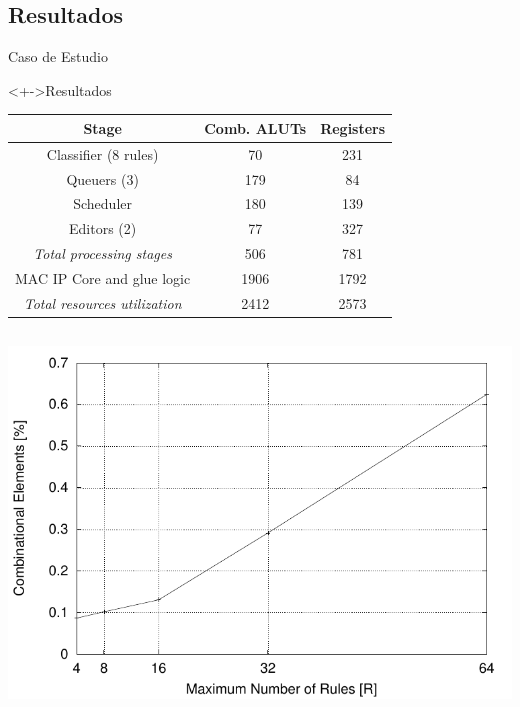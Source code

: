 \documentclass[xcolor=dvipsnames]{beamer}
\begin{document}
\subsection{Resultados}
\begin{frame}{Caso de Estudio}

\begin{block}<+->{Resultados}
  \center

  \begin{table}[h]
  \renewcommand{\arraystretch}{1.3}
  \label{all}
  \centering
  \tiny
  \begin{tabular}{|c|c|c|} \hline
  Stage & Comb. ALUTs & Registers \\ \hline
  Classifier (8 rules) & 70 & 231  \\
  Queuers (3)  & 179 & 84 \\
  Scheduler  & 180 & 139 \\
  Editors (2) & 77 & 327 \\ \hline
  \emph {Total processing stages} & 506 & 781 \\ \hline
  MAC IP Core and glue logic & 1906 & 1792 \\ \hline
  \emph {Total resources utilization} & 2412 & 2573 \\ \hline
     
  \end{tabular}
  \end{table}

  \begin{columns}
	  \begin{column}{0.4\textwidth}
      \center
      \includegraphics[scale=0.35]{figures/comb}
      \hskip1cm
    \end{column} 
    

\end{columns}
\end{block}
\end{frame}
\end{document}
